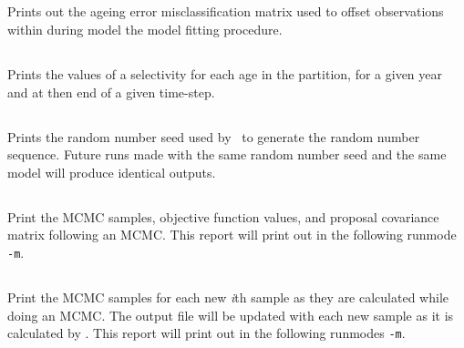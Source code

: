 \subsection{}\label{sec:ageingerrorreport}

Prints out the ageing error misclassification matrix used to offset observations within during model the model fitting procedure.

\subsection{}

Prints the values of a selectivity for each age in the partition, for a given year and at then end of a given time-step.

\subsection{}

Prints the random number seed used by \CNAME\ to generate the random number sequence. Future runs made with the same random number seed and the same model will produce identical outputs.

\subsection{}

Print the MCMC samples, objective function values, and proposal covariance matrix following an MCMC. This report will print out in the following runmode \texttt{-m}.

\subsection{}

Print the MCMC samples for each new \textit{i}th sample as they are calculated while doing an MCMC. The output file will be updated with each new sample as it is calculated by \CNAME. This report will print out in the following runmodes \texttt{-m}.

\subsection{}

